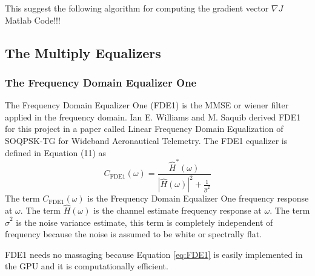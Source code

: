 This suggest the following algorithm for computing the gradient vector $\nabla J$
Matlab Code!!!

\clearpage
\subsection{The Multiply Equalizers}

\subsubsection{The Frequency Domain Equalizer One}
The Frequency Domain Equalizer One (FDE1) is the MMSE or wiener filter applied in the frequency domain.
Ian E. Williams and M. Saquib derived FDE1 for this project in a paper called Linear Frequency Domain Equalization of SOQPSK-TG for Wideband Aeronautical Telemetry.
The FDE1 equalizer is defined in Equation (11) as
\begin{equation}
C_\text{FDE1}(\omega) = \frac{\hat{H}^\ast(\omega)}{|\hat{H}(\omega)|^2+\frac{1}{\hat{\sigma}^2}}
\label{eq:FDE1}
\end{equation}
The term $C_\text{FDE1}(\omega)$ is the Frequency Domain Equalizer One frequency response at $\omega$.
The term $\hat{H}(\omega)$ is the channel estimate frequency response at $\omega$.
The term $\hat{\sigma}^2$ is the noise variance estimate, this term is completely independent of frequency because the noise is assumed to be white or spectrally flat.

FDE1 needs no massaging because Equation \eqref{eq:FDE1} is easily implemented in the GPU and it is computationally efficient.

